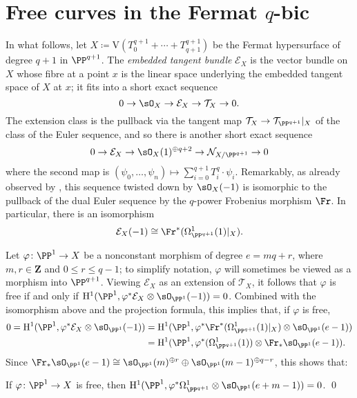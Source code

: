 \section*{Free curves in the Fermat \texorpdfstring{\(q\)}{q}-bic}
In what follows, let
\(X \coloneqq \mathrm{V}(T_0^{q+1} + \cdots + T_{q+1}^{q+1})\) be the Fermat
hypersurface of degree \(q+1\) in \(\PP^{q+1}\). The \emph{embedded tangent
bundle} \(\mathcal{E}_X\) is the vector bundle on \(X\) whose fibre at a point
\(x\) is the linear space underlying the embedded tangent space of \(X\) at
\(x\); it fits into a short exact sequence
\[
0 \to \sO_X \to \mathcal{E}_X \to \mathcal{T}_X \to 0.
\]
The extension class is the pullback via the tangent map
\(\mathcal{T}_X \to \mathcal{T}_{\PP^{q+1}}\rvert_X\) of the class of the Euler
sequence, and so there is another short exact sequence
\[
0 \to \mathcal{E}_X \to \sO_X(1)^{\oplus q+2} \to \mathcal{N}_{X/\PP^{q+1}} \to 0
\]
where the second map is
\((\psi_0,\ldots,\psi_n) \mapsto \sum\nolimits_{i=0}^{q+1} T_i^q \cdot \psi_i\).
Remarkably, as already observed by \cite[Equation (2)]{Shen}, this sequence
twisted down by \(\sO_X(-1)\) is isomorphic to the pullback of the dual Euler
sequence by the \(q\)-power Frobenius morphism \(\Fr\). In particular, there is
an isomorphism
\[
\mathcal{E}_X(-1) \cong \Fr^*(\Omega^1_{\PP^{q+1}}(1)\rvert_X).
\]

Let \(\varphi \colon \PP^1 \to X\) be a nonconstant morphism of degree
\(e = mq + r\), where \(m,r \in \mathbf{Z}\) and \(0 \leq r \leq q-1\); to
simplify notation, \(\varphi\) will sometimes be viewed as a morphism into
\(\PP^{q+1}\). Viewing \(\mathcal{E}_X\) as an extension of \(\mathcal{T}_X\),
it follows that \(\varphi\) is free if and only if
\(\mathrm{H}^1(\PP^1, \varphi^*\mathcal{E}_X \otimes \sO_{\PP^1}(-1)) = 0\).
Combined with the isomorphism above and the projection formula, this implies
that, if \(\varphi\) is free,
\begin{align*}
0
= \mathrm{H}^1(\PP^1, \varphi^*\mathcal{E}_X \otimes \sO_{\PP^1}(-1))
& = \mathrm{H}^1(\PP^1, \varphi^*\Fr^*(\Omega^1_{\PP^{q+1}}(1)\rvert_X) \otimes \sO_{\PP^1}(e-1)) \\
& = \mathrm{H}^1(\PP^1, \varphi^*(\Omega^1_{\PP^{q+1}}(1)) \otimes \Fr_*\sO_{\PP^1}(e-1)).
\end{align*}
Since
\(\Fr_*\sO_{\PP^1}(e-1) \cong \sO_{\PP^1}(m)^{\oplus r} \oplus \sO_{\PP^1}(m-1)^{\oplus q-r}\),
this shows that:

\begin{Lemma}\label{vanishing-H1}
If \(\varphi \colon \PP^1 \to X\) is free, then
\(\mathrm{H}^1(\PP^1, \varphi^*\Omega^1_{\PP^{q+1}} \otimes \sO_{\PP^1}(e + m - 1)) = 0\).
\qed
\end{Lemma}

